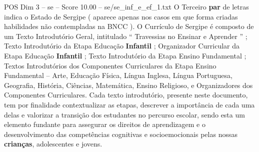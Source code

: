 \begin{textsample}{POS Dim 3 – se – Score 10.00 – se/se\_inf\_e\_ef\_1.txt}
O Terceiro \textbf{par} de letras indica o Estado de Sergipe ( aparece apenas nos casos em que forma criadas habilidades não contempladas na BNCC ).
O Currículo de Sergipe é composto de um Texto Introdutório Geral, intitulado “ Travessias no Ensinar e Aprender ” ; Texto Introdutório da Etapa Educação \textbf{Infantil} ; Organizador Curricular da Etapa Educação \textbf{Infantil} ; Texto Introdutório da Etapa Ensino Fundamental ; Textos Introdutórios dos Componentes Curriculares da Etapa Ensino Fundamental – Arte, Educação Física, Língua Inglesa, Língua Portuguesa, Geografia, História, Ciências, Matemática, Ensino Religioso, e Organizadores dos Componentes Curriculares.
Cada texto introdutório, presente neste documento, tem por finalidade contextualizar as etapas, descrever a importância de cada uma delas e valorizar a transição dos estudantes no percurso escolar, sendo esta um elemento fundante para assegurar os direitos de aprendizagem e o desenvolvimento das competências cognitivas e socioemocionais pelas nossas \textbf{crianças}, adolescentes e jovens.

\end{textsample}
